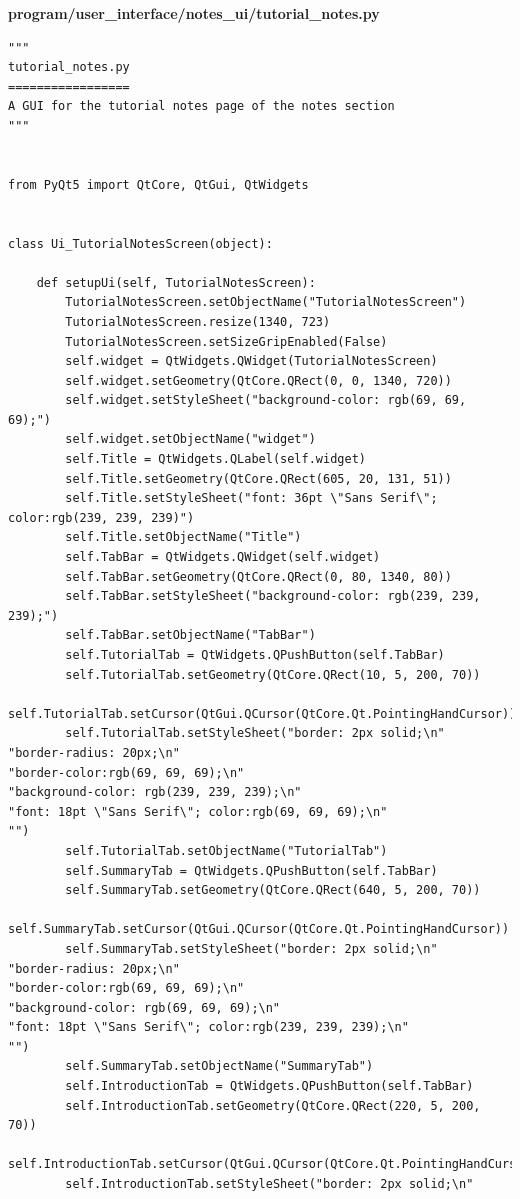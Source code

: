 \documentclass[12pt]{article}
\begin{document}
\textbf{program/user\_interface/notes\_ui/tutorial\_notes.py}
\begin{lstlisting}
"""
tutorial_notes.py
=================
A GUI for the tutorial notes page of the notes section
"""


from PyQt5 import QtCore, QtGui, QtWidgets


class Ui_TutorialNotesScreen(object):

    def setupUi(self, TutorialNotesScreen):
        TutorialNotesScreen.setObjectName("TutorialNotesScreen")
        TutorialNotesScreen.resize(1340, 723)
        TutorialNotesScreen.setSizeGripEnabled(False)
        self.widget = QtWidgets.QWidget(TutorialNotesScreen)
        self.widget.setGeometry(QtCore.QRect(0, 0, 1340, 720))
        self.widget.setStyleSheet("background-color: rgb(69, 69, 69);")
        self.widget.setObjectName("widget")
        self.Title = QtWidgets.QLabel(self.widget)
        self.Title.setGeometry(QtCore.QRect(605, 20, 131, 51))
        self.Title.setStyleSheet("font: 36pt \"Sans Serif\"; color:rgb(239, 239, 239)")
        self.Title.setObjectName("Title")
        self.TabBar = QtWidgets.QWidget(self.widget)
        self.TabBar.setGeometry(QtCore.QRect(0, 80, 1340, 80))
        self.TabBar.setStyleSheet("background-color: rgb(239, 239, 239);")
        self.TabBar.setObjectName("TabBar")
        self.TutorialTab = QtWidgets.QPushButton(self.TabBar)
        self.TutorialTab.setGeometry(QtCore.QRect(10, 5, 200, 70))
        self.TutorialTab.setCursor(QtGui.QCursor(QtCore.Qt.PointingHandCursor))
        self.TutorialTab.setStyleSheet("border: 2px solid;\n"
"border-radius: 20px;\n"
"border-color:rgb(69, 69, 69);\n"
"background-color: rgb(239, 239, 239);\n"
"font: 18pt \"Sans Serif\"; color:rgb(69, 69, 69);\n"
"")
        self.TutorialTab.setObjectName("TutorialTab")
        self.SummaryTab = QtWidgets.QPushButton(self.TabBar)
        self.SummaryTab.setGeometry(QtCore.QRect(640, 5, 200, 70))
        self.SummaryTab.setCursor(QtGui.QCursor(QtCore.Qt.PointingHandCursor))
        self.SummaryTab.setStyleSheet("border: 2px solid;\n"
"border-radius: 20px;\n"
"border-color:rgb(69, 69, 69);\n"
"background-color: rgb(69, 69, 69);\n"
"font: 18pt \"Sans Serif\"; color:rgb(239, 239, 239);\n"
"")
        self.SummaryTab.setObjectName("SummaryTab")
        self.IntroductionTab = QtWidgets.QPushButton(self.TabBar)
        self.IntroductionTab.setGeometry(QtCore.QRect(220, 5, 200, 70))
        self.IntroductionTab.setCursor(QtGui.QCursor(QtCore.Qt.PointingHandCursor))
        self.IntroductionTab.setStyleSheet("border: 2px solid;\n"

\end{lstlisting}
\end{document}
